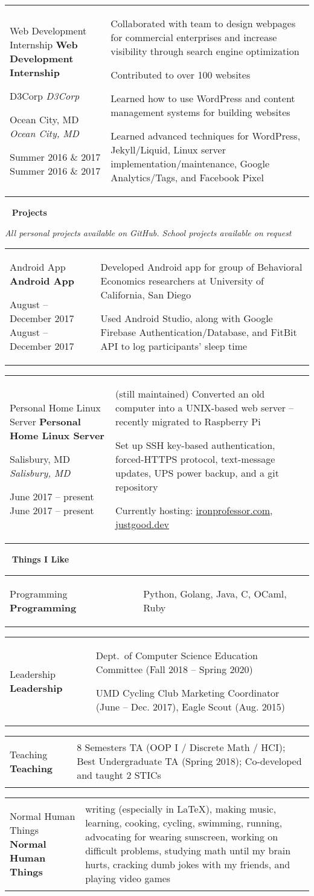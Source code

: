 \documentclass[11pt,letterpaper]{article}
\newcommand{\sect}[1]{
	\begin{center}
		\noindent\xrfill[0.7ex]{0.5pt} \mbox{ } {\Large \bf #1} \mbox{ } \xrfill[0.7ex]{0.5pt}
	\end{center}
}
\newcommand{\entry}[5]{
	{\small
	\noindent
	\begin{tabular}{p{2in} p{\dimexpr \linewidth-2\tabcolsep-2.25in}} %
		\ifx #1  \else \noindent \textbf{#1} \fi
		
		\ifx #2  \else \noindent \textit{#2} \fi
		
		\ifx #3  \else \noindent \textit{#3} \fi
		
		\ifx #4  \else \noindent #4 \fi
		&
		#5
	\end{tabular}
	}
	\vspace{1mm}
}
\begin{document}
\entry{Web Development Internship}{D3Corp}{Ocean City, MD}{Summer 2016 \& 2017}{
	Collaborated with team to design webpages for commercial enterprises and increase visibility through search engine optimization
	
	Contributed to over 100 websites
	
	Learned how to use WordPress and content management systems for building websites
	
	Learned advanced techniques for WordPress, Jekyll/Liquid, Linux server implementation/maintenance, Google Analytics/Tags, and Facebook Pixel
}

\sect{Projects}
\vspace{-5mm}
\begin{center}
	{\small \textit{All personal projects available on GitHub. School projects available on request}}
\end{center}

\entry{Android App}{}{}{August -- December 2017}{
	Developed Android app for group of Behavioral Economics researchers at University of California, San Diego
	
	Used Android Studio, along with Google Firebase Authentication/Database, and FitBit API to log participants' sleep time
}

\entry{Personal Home Linux Server}{}{Salisbury, MD}{June 2017 -- present}{
	(still maintained) Converted an old computer into a UNIX-based web server -- recently migrated to Raspberry Pi
	
	Set up SSH key-based authentication, forced-HTTPS protocol, text-message updates, UPS power backup, and a git repository
		
	Currently hosting: \href{https://ironprofessor.com}{ironprofessor.com}, \href{https://justgood.dev}{justgood.dev}
}


\sect{Things I Like}

\entry{Programming}{}{}{}{
	Python, Golang, Java, C, OCaml, Ruby
}

\entry{Leadership}{}{}{}{
	Dept.\ of Computer Science Education Committee (Fall 2018 -- Spring 2020)
	
	UMD Cycling Club Marketing Coordinator (June -- Dec. 2017), Eagle Scout (Aug. 2015)
}

\entry{Teaching}{}{}{}{
	8 Semesters TA (OOP I / Discrete Math / HCI); Best Undergraduate TA (Spring 2018); Co-developed and taught 2 STICs
}

\entry{Normal Human Things}{}{}{}{
	writing (especially in \LaTeX), making music, learning, cooking, cycling, swimming, running, advocating for wearing sunscreen, working on difficult problems, studying math until my brain hurts, cracking dumb jokes with my friends, and playing video games
}
\end{document}
